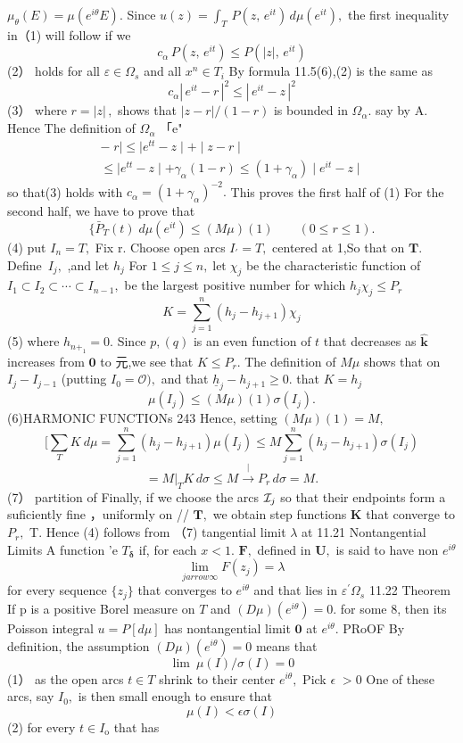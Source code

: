 $\mu_{\theta}(E)=\mu(e^{i\theta}E).$ Since $u(z)=\int_{T}\,P(z,\,e^{i t})\,d\mu(e^{i t}),$ the first inequality in（1) will follow if we $$ c_{\alpha}\,P(z,\,e^{i t})\leq P(\mid z\mid,\,e^{i t}) $$ (2） holds for all $\varepsilon\in\Omega_{s}$ and all $x^{n}\in T_{i}$ By formula 11.5(6),(2) is the same as $$ c_{\alpha}|\,e^{i t}-r\,|^{2}\leq|\,e^{i t}-z\,|^{2} $$ (3） where $r=|z|\,,$ shows that $|z-r|/(1-r)$ is bounded in $\Omega_{\alpha}.$ say by A. Hence The definition of $\Omega_{\alpha}$ 「e" $$ \begin{array}{l}{{-\;r\mid\leq\mid e^{t t}-z\mid+\mid z-r\mid}}\\ {{\leq\mid e^{t t}-z\mid+\gamma_{\alpha}(1-r)\leq(1+\gamma_{\alpha})\mid e^{i t}-z\mid}}\end{array} $$ so that(3) holds with $c_{\alpha}=(1+\gamma_{\alpha})^{-2}.$ This proves the first half of (1) For the second half, we have to prove that $$ \{\bar{P}_{T}(t)\;d\mu(e^{i t})\leq(M\mu)(1)\qquad(0\leq r\leq1). $$ (4) put $I_{n}=T,$ Fix r. Choose open arcs $\scriptstyle I_{\prime}=T,$ centered at 1,So that on ${\boldsymbol{T}}.$ Define $\,I_{j},$ ,and let $h_{j}$ For $1\leq j\leq n,\operatorname{let}\chi_{j}$ be the characteristic function of $I_{1}\subset I_{2}\subset\cdots\subset I_{n-1},$ be the largest positive number for which $h_{j}\chi_{j}\leq P_{r}$ $$ K=\sum_{j=1}^{n}(h_{j}-h_{j+1})\chi_{j} $$ (5) where $h_{n+_{1}}=0.$ Since $\scriptstyle{p,(q)}$ is an even function of ${\mathbf{}}t$ that decreases as $\hat{\boldsymbol{k}}$ increases from $\mathbf{0}$ to 元,we see that $K\leq P_{r}.$ The definition of $M\mu$ shows that on $I_{j}-I_{j-1}$ (putting $I_{0}={\mathcal{O}}),$ and that ${\underline{{h}}}_{j}-h_{j+1}\geq0.$ that $K=h_{j}$ $$ \mu(I_{j})\leq(M\mu)(1)\sigma(I_{j}). $$ (6)HARMONIC FUNCTIONs 243 Hence, setting $(M\mu)(1)=M,$ $$ [\sum_{T}K\ d\mu=\sum_{j=1}^{n}(h_{j}-h_{j+1})\mu(I_{j})\leq M\sum_{j=1}^{n}(h_{j}-h_{j+1})\sigma(I_{j}) $$ $$ =M\left.\right|_{T}K\,d\sigma\leq M\stackrel{ |}{\to}P_{r}\,d\sigma=M. $$ (7） partition of Finally, if we choose the arcs ${\cal I}_{j}$ so that their endpoints form a suficiently fine ，uniformly on // ${\boldsymbol{T}},$ we obtain step functions ${\boldsymbol{K}}$ that converge to $P_{r},$ T. Hence (4) follows from （7) tangential limit $\lambda$ at 11.21 Nontangential Limits A function 'e $T_{\mathbf{\delta}}$ if, for each $x<1.$ ${\boldsymbol{F}},$ defined in ${\boldsymbol{U}},$ is said to have non $e^{i\theta}$ $$ \operatorname*{lim}_{j arrow\infty}F(z_{j})=\lambda $$ for every sequence $\{z_{j}\}$ that converges to $e^{i\theta}$ and that lies in $\scriptstyle{\varepsilon^{\prime}\Omega_{s}}$ 11.22 Theorem If p is a positive Borel measure on ${\mathbf{}}T$ and $(D\mu)(e^{i\theta})=0.$ for some 8, then its Poisson integral $u=P[d\mu]$ has nontangential limit $\mathbf{0}$ at $e^{i\theta}.$ PRoOF By definition, the assumption $(D\mu)(e^{i\theta})=0$ means that $$ \operatorname*{lim}\ \mu(I)/\sigma(I)=0 $$ (1） as the open arcs $\scriptstyle{t\in T}$ shrink to their center $e^{i\theta},$ Pick $\scriptstyle\epsilon\;>0$ One of these arcs, say $I_{\mathrm{0}},$ is then small enough to ensure that $$ \mu(I)<\epsilon\sigma(I) $$ (2) for every $\scriptstyle t\in I_{\mathrm{o}}$ that has 